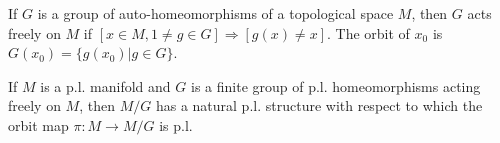 If $G$ is a group of auto-homeomorphisms of a topological space $M$, then $G$ acts freely on $M$ if $[x \in M, 1 \neq g \in G] \Rightarrow [g(x) \neq x]$. The orbit of $x_0$ is $G(x_0) = \{g(x_0) | g \in G\}$.

If $M$ is a p.l. manifold and $G$ is a finite group of p.l. homeomorphisms acting freely on $M$, then $M/G$ has a natural p.l. structure with respect to which the orbit map $\pi: M \rightarrow M/G$ is p.l.
